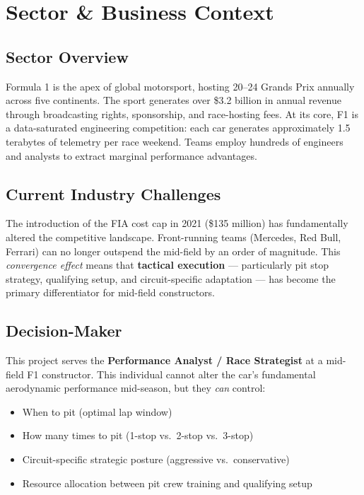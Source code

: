 \documentclass[12pt, a4paper]{article}
\begin{document}
\newpage

\section{Sector \& Business Context}

\subsection{Sector Overview}
Formula 1 is the apex of global motorsport, hosting 20--24 Grands Prix annually across five continents. The sport generates over \$3.2 billion in annual revenue through broadcasting rights, sponsorship, and race-hosting fees. At its core, F1 is a data-saturated engineering competition: each car generates approximately 1.5 terabytes of telemetry per race weekend. Teams employ hundreds of engineers and analysts to extract marginal performance advantages.

\subsection{Current Industry Challenges}
The introduction of the FIA cost cap in 2021 (\$135 million) has fundamentally altered the competitive landscape. Front-running teams (Mercedes, Red Bull, Ferrari) can no longer outspend the mid-field by an order of magnitude. This \textit{convergence effect} means that \textbf{tactical execution} --- particularly pit stop strategy, qualifying setup, and circuit-specific adaptation --- has become the primary differentiator for mid-field constructors.

\subsection{Decision-Maker}
This project serves the \textbf{Performance Analyst / Race Strategist} at a mid-field F1 constructor. This individual cannot alter the car's fundamental aerodynamic performance mid-season, but they \textit{can} control:
\begin{itemize}[noitemsep]
    \item When to pit (optimal lap window)
    \item How many times to pit (1-stop vs.\ 2-stop vs.\ 3-stop)
    \item Circuit-specific strategic posture (aggressive vs.\ conservative)
    \item Resource allocation between pit crew training and qualifying setup
\end{itemize}
\end{document}
